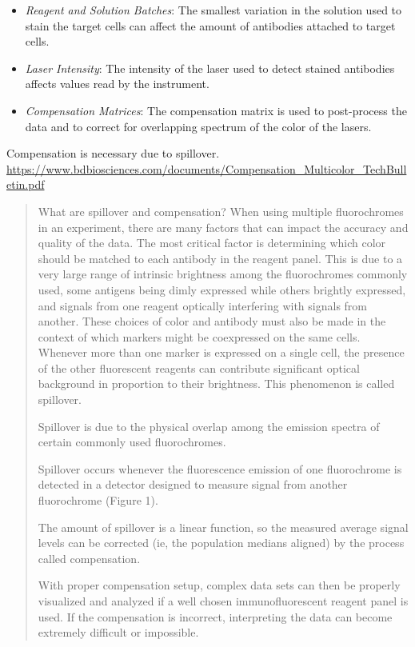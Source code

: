 \begin{itemize}
\item \emph{Reagent and Solution Batches}: The smallest variation in the solution used to stain the target cells can affect the amount of antibodies attached to target cells.
\item \emph{Laser Intensity}: The intensity of the laser used to detect stained antibodies affects values read by the instrument.
\item \emph{Compensation Matrices}: The compensation matrix is used to post-process the data and to correct for overlapping spectrum of the color of the lasers.
\end{itemize}

Compensation is necessary due to spillover.
\url{https://www.bdbiosciences.com/documents/Compensation_Multicolor_TechBulletin.pdf}

\begin{quote}
What are spillover and compensation?
When using multiple fluorochromes in an experiment, there are many factors
that can impact the accuracy and quality of the data. The most critical factor
is determining which color should be matched to each antibody in the reagent
panel. This is due to a very large range of intrinsic brightness among the
fluorochromes commonly used, some antigens being dimly expressed while
others brightly expressed, and signals from one reagent optically interfering
with signals from another. These choices of color and antibody must also be
made in the context of which markers might be coexpressed on the same cells.
Whenever more than one marker is expressed on a single cell, the presence of
the other fluorescent reagents can contribute significant optical background in
proportion to their brightness. This phenomenon is called spillover.

Spillover is due to the physical overlap among the emission spectra of certain
commonly used fluorochromes.

Spillover occurs whenever the fluorescence emission of one fluorochrome is
detected in a detector designed to measure signal from another fluorochrome
(Figure 1).

The amount of spillover is a linear function, so the measured average signal
levels can be corrected (ie, the population medians aligned) by the process
called compensation.

With proper compensation setup, complex data sets can then be properly
visualized and analyzed if a well chosen immunofluorescent reagent panel
is used. If the compensation is incorrect, interpreting the data can become
extremely difficult or impossible.
\end{quote}

